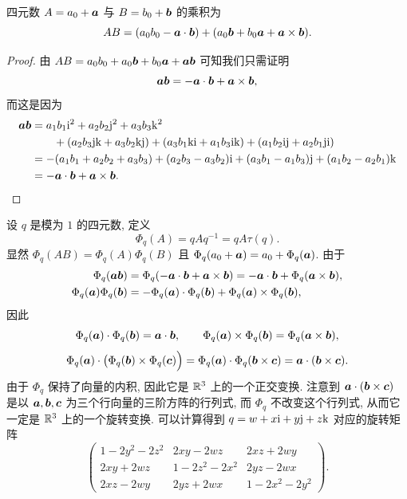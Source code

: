 \begin{theorem}
  四元数 $A=a_0+\bfa$ 与 $B=b_0+\bfb$ 的乘积为
  \[
    AB=(a_0b_0-\bfa\cdot\bfb)+(a_0\bfb+b_0\bfa+\bfa\times\bfb).
  \]
\end{theorem}

\begin{proof}
  由 $AB=a_0b_0+a_0\bfb+b_0\bfa+\bfa\bfb$ 可知我们只需证明
  \[
    \bfa\bfb=-\bfa\cdot\bfb+\bfa\times\bfb,
  \]
  而这是因为
  \begin{align*}
     \bfa\bfb&
    =a_1b_1\ii^2+a_2b_2\jj^2+a_3b_3\kk^2\\&
      \qquad
      +(a_2b_3\jj\kk+a_3b_2\kk\jj)
      +(a_3b_1\kk\ii+a_1b_3\ii\kk)
      +(a_1b_2\ii\jj+a_2b_1\jj\ii)\\&
    =-(a_1b_1+a_2b_2+a_3b_3)
      +(a_2b_3-a_3b_2)\ii
      +(a_3b_1-a_1b_3)\jj
      +(a_1b_2-a_2b_1)\kk\\&
    =-\bfa\cdot\bfb+\bfa\times\bfb.\qedhere
  \end{align*}
\end{proof}

设 $q$ 是模为 $1$ 的四元数, 定义
\begin{equation}
  \label{eq:rotation-quaternion}
  \Phi_q(A)=qAq^{-1}=qA\tau(q).
\end{equation}
显然 $\Phi_q(AB)=\Phi_q(A)\Phi_q(B)$ 且 $\Phi_q(a_0+\bfa)=a_0+\Phi_q(\bfa)$.
由于
\begin{align*}
   \Phi_q(\bfa\bfb)&
   =\Phi_q(-\bfa\cdot\bfb+\bfa\times\bfb)
   =-\bfa\cdot\bfb+\Phi_q(\bfa\times\bfb),\\
   \Phi_q(\bfa)\Phi_q(\bfb)&
  =-\Phi_q(\bfa)\cdot\Phi_q(\bfb)
    +\Phi_q(\bfa)\times\Phi_q(\bfb),
\end{align*}
因此
\[
   \Phi_q(\bfa)\cdot\Phi_q(\bfb)
  =\bfa\cdot\bfb,\qquad
   \Phi_q(\bfa)\times\Phi_q(\bfb)
  =\Phi_q(\bfa\times\bfb),
\]
\[
  \Phi_q(\bfa)\cdot\bigl(\Phi_q(\bfb)\times\Phi_q(\bfc)\Bigr)
  =\Phi_q(\bfa)\cdot\Phi_q(\bfb\times\bfc)
  =\bfa\cdot(\bfb\times\bfc).
\]
由于 $\Phi_q$ 保持了向量的内积, 因此它是 $\BR^3$ 上的一个正交变换.
注意到 $\bfa\cdot(\bfb\times\bfc)$ 是以 $\bfa,\bfb,\bfc$ 为三个行向量的三阶方阵的行列式, 而 $\Phi_q$ 不改变这个行列式, 从而它一定是 $\BR^3$ 上的一个旋转变换.
可以计算得到 $q=w+x\ii+y\jj+z\kk$ 对应的旋转矩阵
\[
 \begin{pmatrix}
   1-2y^2-2z^2&2xy-2wz&2xz+2wy\\
   2xy+2wz&1-2z^2-2x^2&2yz-2wx\\
   2xz-2wy&2yz+2wx&1-2x^2-2y^2
 \end{pmatrix}.
\]

